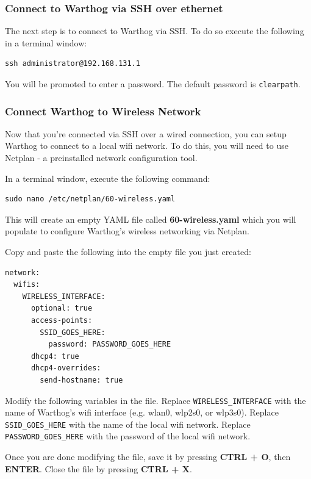 \documentclass[]{clearpath-latex/clearpath-manual}
\begin{document}
\subsubsection{Connect to Warthog via SSH over ethernet}

The next step is to connect to Warthog via SSH.  To do so execute the following in a terminal window:

\begin{lstlisting}
ssh administrator@192.168.131.1
\end{lstlisting}

You will be promoted to enter a password.  The default password is \lstinline{clearpath}.

\subsubsection{Connect Warthog to Wireless Network}

Now that you're connected via SSH over a wired connection, you can setup Warthog to connect to a local wifi network. To do this, you will need to use Netplan - a preinstalled network configuration tool.

In a terminal window, execute the following command:

\begin{lstlisting}
sudo nano /etc/netplan/60-wireless.yaml
\end{lstlisting}

This will create an empty YAML file called \textbf{60-wireless.yaml} which you will populate to configure Warthog's wireless networking via Netplan.

Copy and paste the following into the empty file you just created:

\begin{lstlisting}
network:
  wifis:
    WIRELESS_INTERFACE:
      optional: true
      access-points:
        SSID_GOES_HERE:
          password: PASSWORD_GOES_HERE
      dhcp4: true
      dhcp4-overrides:
        send-hostname: true
\end{lstlisting}

Modify the following variables in the file. Replace \lstinline{WIRELESS_INTERFACE} with the name of Warthog's wifi interface (e.g. wlan0, wlp2s0, or wlp3s0). Replace \lstinline{SSID_GOES_HERE} with the name of the local wifi network. Replace \lstinline{PASSWORD_GOES_HERE} with the password of the local wifi network. 

Once you are done modifying the file, save it by pressing \textbf{CTRL + O}, then \textbf{ENTER}. Close the file by pressing \textbf{CTRL + X}.
\end{document}
